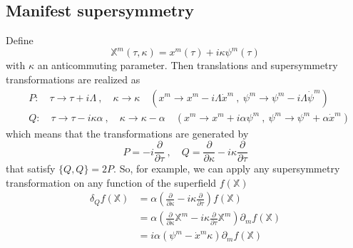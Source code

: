 \documentclass[a4paper,12pt]{article}
\numberwithin{equation}{section}
\numberwithin{exe}{section}
\newcommand{\X}{{\mathbb X}}
\newcommand{\p}{{\partial}}
\newcommand{\xd}{{\dot x}}
\renewcommand{\a}{{\alpha}}
\renewcommand{\d}{{\delta}}
\renewcommand{\k}{{\kappa}}
\renewcommand{\L}{{\Lambda}}
\begin{document}
\subsection{Manifest supersymmetry}
Define
	\begin{equation}
	\X^m (\tau,\k) = x^m(\tau) + i\k\psi^m(\tau)
	\end{equation}
with $\k$ an anticommuting parameter. Then translations and supersymmetry transformations are realized as
	\begin{align}
	& P: \quad \tau \rightarrow \tau + i\L\ ,\quad \k\rightarrow \k\quad (x^m\rightarrow x^m - i\L\xd^m\ ,\ \psi^m\rightarrow \psi^m-i\L\dot\psi^m) \\
	& Q: \quad \tau\rightarrow \tau - i\k\a\ ,\quad \k\rightarrow \k - \a\quad (x^m\rightarrow x^m+i\a\psi^m\ ,\ \psi^m\rightarrow \psi^m+\a\xd^m)
	\end{align}
which means that the transformations are generated by
	\begin{equation}
	P = -i\frac{\p}{\p\tau}\ ,\quad Q=\frac{\p}{\p\k}-i\k\frac{\p}{\p\tau}
	\end{equation}
that satisfy $\{Q,Q\} = 2P$. So, for example, we can apply any supersymmetry transformation on any function of the superfield $f(\X)$
	\begin{align}
	\d_Q f(\X) & = \a\left(\frac{\p}{\p\k}-i\k\frac{\p}{\p\tau}\right)f(\X) \nonumber \\
	& = \a\left(\frac{\p}{\p\k}\X^m - i\k\frac{\p}{\p\tau}\X^m\right) \p_m f(\X) \nonumber \\
	& = i\a(\psi^m - \xd^m \k)\p_m f(\X)
	\end{align}
\end{document}
